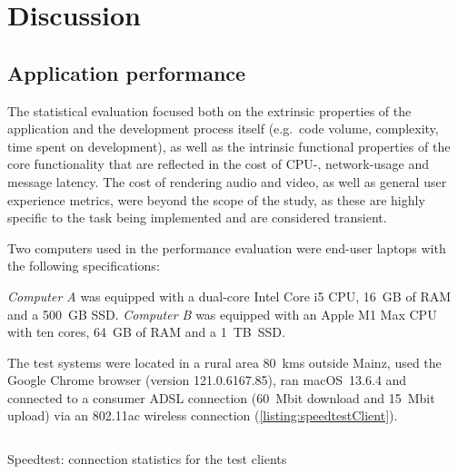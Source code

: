 \chapter{Discussion}
\label{ch:discussion}


\section{Application performance}
\label{sec:statistics}

The statistical evaluation focused both on the extrinsic properties of the application and the development process itself (e.g.\ code volume, complexity, time spent on development), as well as the intrinsic functional properties of the core functionality that are reflected in the cost of \ac{CPU}-, network-usage and message latency.
The cost of rendering audio and video, as well as general user experience metrics, were beyond the scope of the study, as these are highly specific to the task being implemented and are considered transient.

Two computers used in the performance evaluation were end-user laptops with the following specifications:

\emph{Computer A} was equipped with a dual-core Intel Core i5 \ac{CPU}, 16~\ac{GB} of \ac{RAM} and a 500~\ac{GB} \ac{SSD}.
\emph{Computer B} was equipped with an Apple M1 Max \ac{CPU} with ten cores, 64~\ac{GB} of \ac{RAM} and a 1~\ac{TB}~\ac{SSD}.

The test systems were located in a rural area 80~\acp{km} outside Mainz, used the Google Chrome browser (version 121.0.6167.85), ran macOS~13.6.4 and connected to a consumer \ac{ADSL} connection (60~\ac{Mbit} download and 15~\ac{Mbit} upload) via an 802.11ac wireless connection (\autoref{listing:speedtestClient}).

\begin{listing}[!ht]
\inputminted{text}{04_Artefakte/03_Listings/speedtest-client.txt}
\caption{Speedtest: connection statistics for the test clients\protect}
\label{listing:speedtestClient}
\end{listing}

